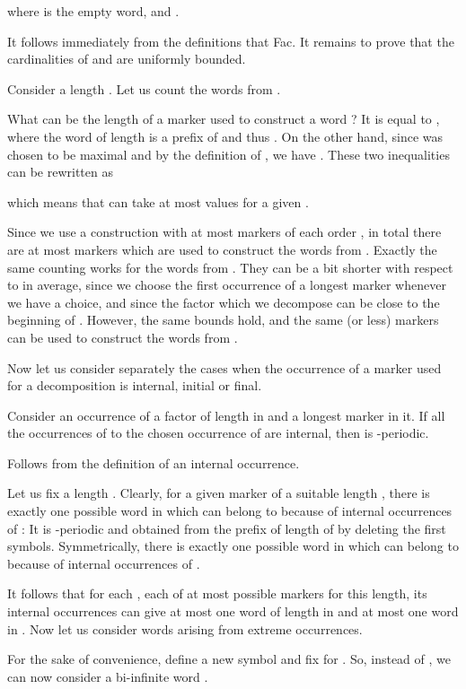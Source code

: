 \documentclass[runningheads,envcountsect,envcountsame]{llncs}
\begin{document}
where  is the empty word,  and .

It follows immediately from the definitions that Fac. It remains to prove that the cardinalities of  and  are uniformly bounded.

Consider a length . Let us count the words from .

What can be the length of a marker  used to construct a word ? It is equal to , where the word  of length  is a prefix of  and thus . On the other hand, since  was chosen to be maximal and by the definition of , we have . These two inequalities can be rewritten as

which means that  can take at most  values for a given .

Since we use a construction with at most  markers of each order , in total there are at most  markers which are used to construct the words from . Exactly the same counting works for the words from . They can be a bit shorter with respect to  in average, since we choose the first occurrence of a longest marker whenever we have a choice, and since the factor which we decompose can be close to the beginning of . However, the same bounds hold, and the same  (or less) markers can be used to construct the words from .

Now let us consider separately the cases when the occurrence of a marker used for a decomposition is internal, initial or final.

\begin{lemma}
Consider an occurrence of a factor  of length  in  and a longest marker  in it. If all the occurrences of  to the chosen occurrence of  are internal, then  is -periodic.
\end{lemma}
 Follows from the definition of an internal occurrence. \hfill 

Let us fix a length . Clearly, for a given marker  of a suitable length , there is exactly one possible word in  which can belong to  because of internal occurrences of : It is -periodic and obtained from the prefix of length  of 
by deleting the first  symbols. Symmetrically, there is exactly one possible word in  which can belong to  because of internal occurrences of .


It follows that for each , each of at most  possible markers for this length, its internal occurrences can give at most one word of length  in  and at most one word in . Now let us consider words arising from extreme occurrences.

For the sake of convenience, define a new symbol  and fix  for . So, instead of , we can now consider a bi-infinite word .
\end{document}
